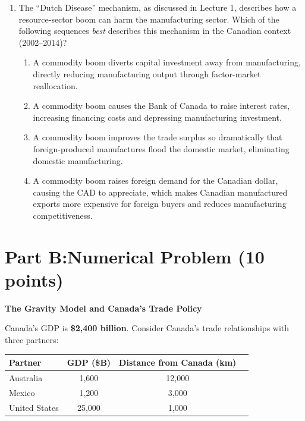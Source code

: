 \documentclass[11pt]{article}
\begin{document}
\begin{enumerate}
\medskip

\item The ``Dutch Disease'' mechanism, as discussed in Lecture 1, describes
how a resource-sector boom can harm the manufacturing sector. Which of the
following sequences \emph{best} describes this mechanism in the Canadian context
(2002--2014)?

\medskip
\begin{enumerate}[label=\textbf{\Alph*)},leftmargin=2em,itemsep=0.4em]
  \item A commodity boom diverts capital investment away from manufacturing,
        directly reducing manufacturing output through factor-market reallocation.
  \item A commodity boom causes the Bank of Canada to raise interest rates,
        increasing financing costs and depressing manufacturing investment.
  \item A commodity boom improves the trade surplus so dramatically that
        foreign-produced manufactures flood the domestic market, eliminating
        domestic manufacturing.
  \item A commodity boom raises foreign demand for the Canadian dollar, causing
        the CAD to appreciate, which makes Canadian manufactured exports more
        expensive for foreign buyers and reduces manufacturing competitiveness.
\end{enumerate}
\end{enumerate}

\bigskip



\section{Part B:\enspace Numerical Problem\quad\normalfont\small
         (10 points)}


\bigskip

\noindent\textbf{The Gravity Model and Canada's Trade Policy}

\medskip
\noindent Canada's GDP is \textbf{\$2,400 billion}. Consider Canada's trade
relationships with three partners:

\vspace{0.5em}
\begin{center}
\begin{tabular}{lccc}
\toprule
\textbf{Partner} & \textbf{GDP (\$B)} & \textbf{Distance from Canada (km)}\\
\midrule
Australia      & 1{,}600  & 12{,}000 \\
Mexico         & 1{,}200  & \phantom{1}3{,}000 \\
United States  & 25{,}000 & \phantom{1}1{,}000 \\
\bottomrule
\end{tabular}
\end{center}
\vspace{0.5em}
\end{document}
